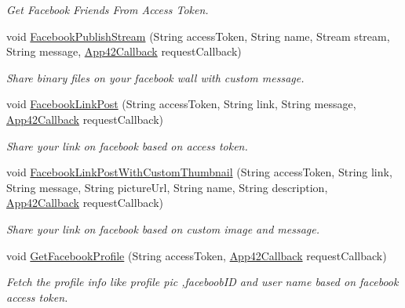 \begin{DoxyCompactItemize}
\begin{DoxyCompactList}\small\item\em Get Facebook Friends From Access Token. \end{DoxyCompactList}\item 
void \hyperlink{classcom_1_1shephertz_1_1app42_1_1paas_1_1sdk_1_1windows_1_1social_1_1_social_service_a7e23153ec9740f34f48f048b564976db}{Facebook\+Publish\+Stream} (String access\+Token, String name, Stream stream, String message, \hyperlink{interfacecom_1_1shephertz_1_1app42_1_1paas_1_1sdk_1_1windows_1_1_app42_callback}{App42\+Callback} request\+Callback)
\begin{DoxyCompactList}\small\item\em Share binary files on your facebook wall with custom message. \end{DoxyCompactList}\item 
void \hyperlink{classcom_1_1shephertz_1_1app42_1_1paas_1_1sdk_1_1windows_1_1social_1_1_social_service_af990c6f6a81760cca3f0d45262df51be}{Facebook\+Link\+Post} (String access\+Token, String link, String message, \hyperlink{interfacecom_1_1shephertz_1_1app42_1_1paas_1_1sdk_1_1windows_1_1_app42_callback}{App42\+Callback} request\+Callback)
\begin{DoxyCompactList}\small\item\em Share your link on facebook based on access token. \end{DoxyCompactList}\item 
void \hyperlink{classcom_1_1shephertz_1_1app42_1_1paas_1_1sdk_1_1windows_1_1social_1_1_social_service_ab718a8e118dbb4591e3e0f5c6a71118b}{Facebook\+Link\+Post\+With\+Custom\+Thumbnail} (String access\+Token, String link, String message, String picture\+Url, String name, String description, \hyperlink{interfacecom_1_1shephertz_1_1app42_1_1paas_1_1sdk_1_1windows_1_1_app42_callback}{App42\+Callback} request\+Callback)
\begin{DoxyCompactList}\small\item\em Share your link on facebook based on custom image and message. \end{DoxyCompactList}\item 
void \hyperlink{classcom_1_1shephertz_1_1app42_1_1paas_1_1sdk_1_1windows_1_1social_1_1_social_service_ad5f6f7647890c6525a4267683608f4b2}{Get\+Facebook\+Profile} (String access\+Token, \hyperlink{interfacecom_1_1shephertz_1_1app42_1_1paas_1_1sdk_1_1windows_1_1_app42_callback}{App42\+Callback} request\+Callback)
\begin{DoxyCompactList}\small\item\em Fetch the profile info like profile pic ,faceboob\+I\+D and user name based on facebook access token. \end{DoxyCompactList}\item 

\end{DoxyCompactItemize}
